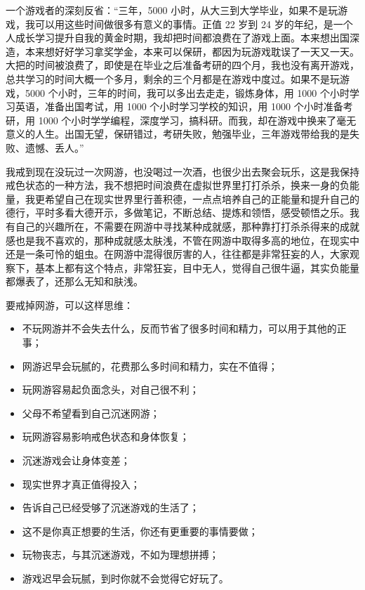 一个游戏者的深刻反省：“三年，5000 小时，从大三到大学毕业，如果不是玩游戏，我可以用这些时间做很多有意义的事情。正值 22 岁到 24 岁的年纪，是一个人成长学习提升自我的黄金时期，我却把时间都浪费在了游戏上面。本来想出国深造，本来想好好学习拿奖学金，本来可以保研，都因为玩游戏耽误了一天又一天。大把的时间被浪费了，即使是在毕业之后准备考研的四个月，我也没有离开游戏，总共学习的时间大概一个多月，剩余的三个月都是在游戏中度过。如果不是玩游戏，5000 个小时，三年的时间，我可以多出去走走，锻炼身体，用 1000 个小时学习英语，准备出国考试，用 1000 个小时学习学校的知识，用 1000 个小时准备考研，用 1000 个小时学学编程，深度学习，搞科研。而我，却在游戏中换来了毫无意义的人生。出国无望，保研错过，考研失败，勉强毕业，三年游戏带给我的是失败、遗憾、丢人。”

我戒到现在没玩过一次网游，也没喝过一次酒，也很少出去聚会玩乐，这是我保持戒色状态的一种方法，我不想把时间浪费在虚拟世界里打打杀杀，换来一身的负能量，我更希望自己在现实世界里行善积德，一点点培养自己的正能量和提升自己的德行，平时多看大德开示，多做笔记，不断总结、提炼和领悟，感受顿悟之乐。我有自己的兴趣所在，不需要在网游中寻找某种成就感，那种靠打打杀杀得来的成就感也是我不喜欢的，那种成就感太肤浅，不管在网游中取得多高的地位，在现实中还是一条可怜的蛆虫。在网游中混得很厉害的人，往往都是非常狂妄的人，大家观察下，基本上都有这个特点，非常狂妄，目中无人，觉得自己很牛逼，其实负能量都爆表了，还那么无知和肤浅。

要戒掉网游，可以这样思维：

\begin{itemize}
    \item 不玩网游并不会失去什么，反而节省了很多时间和精力，可以用于其他的正事；
    \item 网游迟早会玩腻的，花费那么多时间和精力，实在不值得；
    \item 玩网游容易起负面念头，对自己很不利；
    \item 父母不希望看到自己沉迷网游；
    \item 玩网游容易影响戒色状态和身体恢复；
    \item 沉迷游戏会让身体变差；
    \item 现实世界才真正值得投入；
    \item 告诉自己已经受够了沉迷游戏的生活了；
    \item 这不是你真正想要的生活，你还有更重要的事情要做；
    \item 玩物丧志，与其沉迷游戏，不如为理想拼搏；
    \item 游戏迟早会玩腻，到时你就不会觉得它好玩了。
\end{itemize}

